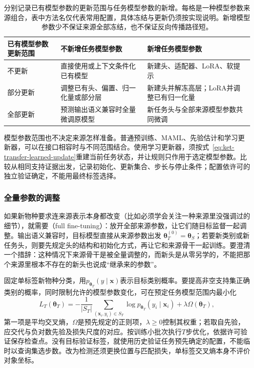 \begin{table}[htbp]
  \centering
  \small
  \begin{tabularx}{\linewidth}{p{28mm}XX}
    \toprule
    已有模型参数更新范围 & 不新增任务模型参数 & 新增任务模型参数 \\
    \midrule
    不更新 & 直接使用或上下文条件化已有模型 & 新建头、适配器、LoRA、软提示 \\
    部分更新 & 调整已有头、偏置、归一化量或部分层 & 新建头并解冻高层；LoRA并调整已有归一化量 \\
    全部更新 & 预测输出语义兼容时全量微调原模型 & 新任务头与全部来源模型参数共同微调 \\
    \bottomrule
  \end{tabularx}
  \caption{分别记录已有模型参数的更新范围与任务模型参数的新增。每格是一种模型参数来源组合，表中方法名仅代表常用配置，具体冻结与更新仍须按实现说明。新增模型参数少不保证来源全部冻结，也不保证反向传播路径短。}
  \label{tab:ket-transfer-parameter-axes}
\end{table}

模型参数范围也不决定来源怎样准备。普通预训练、MAML、先验估计和学习更新器，可以在接口相容时与不同范围结合。使用学习更新器，须按式~\eqref{eq:ket-transfer-learned-update}重建当前任务状态，并让规则只作用于选定模型参数。比较从相同支持证据出发，记录初始化、更新集合、步长与停止条件；配置依许可的独立验证确定，不能用最终标签选择。

\subsubsection{全量参数的调整}
\label{sec:ket-transfer-full-finetuning}

如果新物种要求连来源表示本身都改变（比如必须学会关注一种来源里没强调过的细节），就需要（full fine-tuning）：放开全部来源参数，让它们随目标监督一起调整。输出语义兼容时，目标模型直接从来源参数出发 $\bm\theta_T^{(0)}=\bm\theta_S$；若要新类别或新任务头，则要先规定头的结构和初始化方式，再让它和来源骨干一起训练。要澄清一个措辞：这种情况下来源骨干是被全量调整的，而新头是从零另学的，不能把那个来源里根本不存在的新头也说成“继承来的参数”。

固定单标签新物种分类，用$p_{\bm\theta_T}(y\mid\bm x)$表示目标类别概率。要提高非空支持集正确类别的概率，同时限制允许的模型参数变化，可在预定任务模型范围内最小化
\begin{equation}
  L_T(\bm{\theta}_T)
   =-\frac1{|S_T|}\sum_{(\bm x_i,y_i)\in S_T}
       \log p_{\bm{\theta}_T}(y_i\mid\bm x_i)
       +\lambda\Omega(\bm{\theta}_T),
  \label{eq:ket-transfer-finetuning-loss}
\end{equation}
第一项是平均交叉熵，$\Omega$是预先规定的正则项，$\lambda\ge0$控制其权重；若取自先验，应交代与负对数先验及损失尺度的对应。按训练小批次执行$T$步优化，依据许可验证保存检查点。没有目标验证标签，就使用历史验证任务预先确定的配置，不能临时以查询集选步数。改为检测还须更换位置与匹配损失，单标签交叉熵本身不评价对象坐标。

